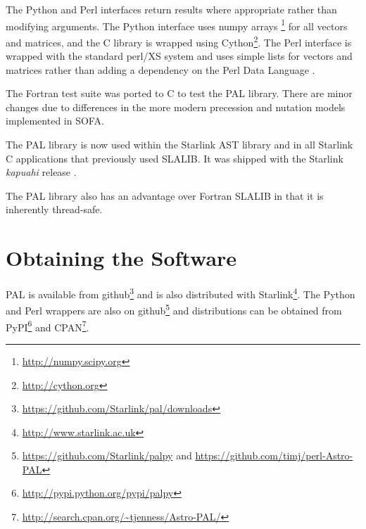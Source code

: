 The Python and Perl interfaces return results where appropriate rather than modifying arguments. The Python interface uses numpy arrays \citep[e.g.][]{Walt2011}\footnote{\url{http://numpy.scipy.org}} for   all vectors and matrices, and the C library is wrapped using Cython\footnote{\url{http://cython.org}}. The Perl interface is wrapped with the standard perl/XS system \citep[e.g.][]{JennessBook} and uses simple lists for vectors and matrices rather than adding a dependency on the Perl Data Language \citep{PDL}.

The Fortran test suite was ported to C to test the PAL library. There are minor changes due to differences in the more modern precession and nutation models implemented in SOFA.

The PAL library is now used within the Starlink AST library \citep{2012ASPC..461..825B} and in all Starlink C applications that previously used SLALIB. It was shipped with the Starlink \textit{kapuahi} release \citep{P005_adassxxii}.

The PAL library also has an advantage over Fortran SLALIB in that it is inherently thread-safe.


\section{Obtaining the Software}

PAL is available from github\footnote{\url{https://github.com/Starlink/pal/downloads}} and is also distributed with Starlink\footnote{\url{http://www.starlink.ac.uk}}.  The Python and Perl wrappers are also on github\footnote{\url{https://github.com/Starlink/palpy} and \url{https://github.com/timj/perl-Astro-PAL}} and distributions can be obtained from PyPI\footnote{\url{http://pypi.python.org/pypi/palpy}} and CPAN\footnote{\url{http://search.cpan.org/~tjenness/Astro-PAL/}}.


